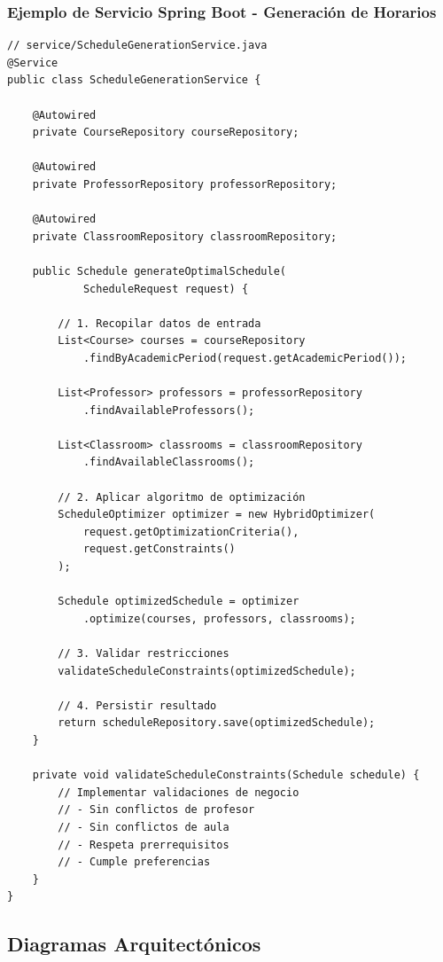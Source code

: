 \subsubsection{Ejemplo de Servicio Spring Boot - Generación de Horarios}
\begin{verbatim}
// service/ScheduleGenerationService.java
@Service
public class ScheduleGenerationService {

    @Autowired
    private CourseRepository courseRepository;

    @Autowired
    private ProfessorRepository professorRepository;

    @Autowired
    private ClassroomRepository classroomRepository;

    public Schedule generateOptimalSchedule(
            ScheduleRequest request) {

        // 1. Recopilar datos de entrada
        List<Course> courses = courseRepository
            .findByAcademicPeriod(request.getAcademicPeriod());

        List<Professor> professors = professorRepository
            .findAvailableProfessors();

        List<Classroom> classrooms = classroomRepository
            .findAvailableClassrooms();

        // 2. Aplicar algoritmo de optimización
        ScheduleOptimizer optimizer = new HybridOptimizer(
            request.getOptimizationCriteria(),
            request.getConstraints()
        );

        Schedule optimizedSchedule = optimizer
            .optimize(courses, professors, classrooms);

        // 3. Validar restricciones
        validateScheduleConstraints(optimizedSchedule);

        // 4. Persistir resultado
        return scheduleRepository.save(optimizedSchedule);
    }

    private void validateScheduleConstraints(Schedule schedule) {
        // Implementar validaciones de negocio
        // - Sin conflictos de profesor
        // - Sin conflictos de aula
        // - Respeta prerrequisitos
        // - Cumple preferencias
    }
}
\end{verbatim}

\subsection{Diagramas Arquitectónicos}

